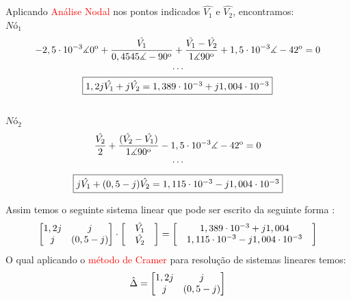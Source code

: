 \documentclass[
	12pt,				%
	oneside,			%
	a4paper,			%
	english,			%
	french,				%
	spanish,			%
	brazil				%
	]{abntex2}
\begin{document}
\newline
Aplicando \textcolor{red}{Análise Nodal} nos pontos indicados $\hat{V_1}$ e $\hat{V_2}$, encontramos:\\
$ Nó_1 $
$$-2,5 \cdot 10^{-3} \measuredangle 0\textsuperscript{o} + \dfrac{\hat{V_1}}{0,4545 \measuredangle -90\textsuperscript{o}} + \dfrac{\hat{V_1} - \hat{V_2}}{1 \measuredangle  90\textsuperscript{o}} + 1,5 \cdot 10^{-3} \measuredangle -42\textsuperscript{o} = 0 $$
$$ \cdot \cdot \cdot $$
\begin{equation}
    \fbox{$1,2j\hat{V_1} + j\hat{V_2} = 1,389 \cdot 10^{-3} + j1,004 \cdot 10^{-3} $}
    \end{equation}\\
$ Nó_2 $
$$ \dfrac{\hat{V_2}}{2} + \dfrac{( \hat{V_2} - \hat{V_1} )}{1 \measuredangle 90\textsuperscript{o}} - 1,5\cdot 10^{-3} \measuredangle -42\textsuperscript{o} = 0$$
$$ \cdot \cdot \cdot $$

\begin{equation}
    \fbox{$j\hat{V_1} + (0,5 - j) \hat{V_2} = 1,115 \cdot 10^{-3} -  j1,004\cdot 10^{-3}$}
\end{equation}

Assim temos o seguinte sistema linear que pode ser escrito da seguinte forma : 
\begin{equation}
    \centering
    \begin{bmatrix}
        1,2j & j \\
        j & (0,5 - j)\\
    \end{bmatrix}
    \cdot
    \begin{bmatrix}
        &\hat{V_1}&\\
        &\hat{V_2}&\\
    \end{bmatrix}
    =
    \begin{bmatrix}
        &1,389 \cdot 10^{-3} + j1,004 &\\
        &1,115 \cdot 10^{-3} -  j1,004\cdot 10^{-3}&\\
    \end{bmatrix}
\end{equation}
O qual aplicando o \textcolor{red}{método de Cramer} para resolução de sistemas lineares temos:
\begin{equation*}
    \centering
    \hat{\Delta} =
    \begin{bmatrix}
        1,2j & j \\
        j & (0,5 - j)\\
    \end{bmatrix}  
\end{equation*}
\end{document}

